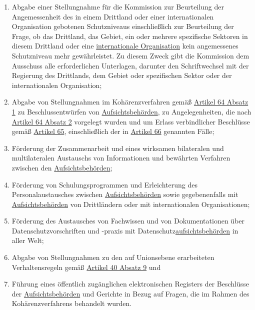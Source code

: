 \begin{enumerate}
\begin{enumerate}
    \item Abgabe einer Stellungnahme für die Kommission zur Beurteilung der Angemessenheit des in einem Drittland oder
     einer internationalen Organisation gebotenen Schutzniveaus einschließlich zur Beurteilung der Frage, ob das
     Drittland, das Gebiet, ein oder mehrere spezifische Sektoren in diesem Drittland oder eine \hyperref[itm:04-29]
     {internationale Organisation} kein angemessenes Schutzniveau mehr gewährleistet. Zu diesem Zweck gibt die
     Kommission dem Ausschuss alle erforderlichen Unterlagen, darunter den Schriftwechsel mit der Regierung des
     Drittlands, dem Gebiet oder spezifischen Sektor oder der internationalen Organisation;%
    \label{itm:70-1s}

    \item Abgabe von Stellungnahmen im Kohärenzverfahren gemäß \hyperref[itm:64-1]{Artikel 64 Absatz 1} zu
     Beschlussentwürfen von \hyperref[itm:04-21]{Aufsichtsbehörden}, zu Angelegenheiten, die nach \hyperref[itm:64-2]
     {Artikel 64 Absatz 2} vorgelegt wurden und um Erlass verbindlicher Beschlüsse gemäß \hyperref[ch:65]{Artikel 65},
     einschließlich der in \hyperref[ch:66]{Artikel 66} genannten Fälle;%
    \label{itm:70-1t}

    \item Förderung der Zusammenarbeit und eines wirksamen bilateralen und multilateralen Austauschs von Informationen
     und bewährten Verfahren zwischen den \hyperref[itm:04-21]{Aufsichtsbehörden};%
    \label{itm:70-1u}

    \item Förderung von Schulungsprogrammen und Erleichterung des Personalaustausches zwischen \hyperref[itm:04-21]
     {Aufsichtsbehörden} sowie gegebenenfalls mit \hyperref[itm:04-21]{Aufsichtsbehörden} von Drittländern oder mit
     internationalen Organisationen;%
    \label{itm:70-1v}

    \item Förderung des Austausches von Fachwissen und von Dokumentationen über Datenschutzvorschriften und -praxis mit
     Datenschutz\hyperref[itm:04-21]{aufsichtsbehörden} in aller Welt;%
    \label{itm:70-1w}

    \item Abgabe von Stellungnahmen zu den auf Unionsebene erarbeiteten Verhaltensregeln gemäß \hyperref[itm:40-9]
     {Artikel 40 Absatz 9} und%
    \label{itm:70-1x}

    \item Führung eines öffentlich zugänglichen elektronischen Registers der Beschlüsse der \hyperref[itm:04-21]
     {Aufsichtsbehörden} und Gerichte in Bezug auf Fragen, die im Rahmen des Kohärenzverfahrens behandelt wurden.%
    \label{itm:70-1y}


\end{enumerate}
\end{enumerate}
